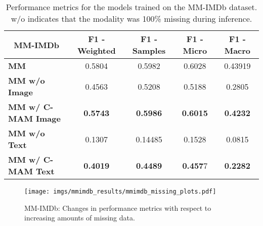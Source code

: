 \begin{table}[htbp!]
    \footnotesize
    \centering
    \caption{Performance metrics for the models trained on the MM-IMDb dataset. w/o indicates that the modality was 100\% missing during inference.}
    \label{tab:mmimdb_res}
    \begin{tabular}{l|cccc}
    \hline
    \multicolumn{1}{c|}{\textbf{MM-IMDb}} & \textbf{F1 - Weighted} & \textbf{F1 - Samples} & \textbf{F1 - Micro} & \textbf{F1 - Macro} \\ \hline
    \textbf{MM}                & 0.5804 & 0.5982  & 0.6028 & 0.43919 \\ \hline
    \textbf{MM w/o Image}      & 0.4563 & 0.5208  & 0.5188 & 0.2805  \\
    \textbf{MM w/ C-MAM Image} & \textbf{0.5743} & \textbf{0.5986}  & \textbf{0.6015} & \textbf{0.4232}  \\ \hline
    \textbf{MM w/o Text}       & 0.1307 & 0.14485 & 0.1528 & 0.0815  \\
    \textbf{MM w/ C-MAM Text}  & \textbf{0.4019} & \textbf{0.4489}  & \textbf{0.457}7 & \textbf{0.2282}  \\ \hline
    \end{tabular}%
\end{table}

\begin{figure}[htbp!]
    \centering
    \texttt{[image: imgs/mmimdb\_results/mmimdb\_missing\_plots.pdf]}
    \caption{MM-IMDb: Changes in performance metrics with respect to increasing amounts of missing data.}
    \label{fig:mmimdb}
\end{figure}


